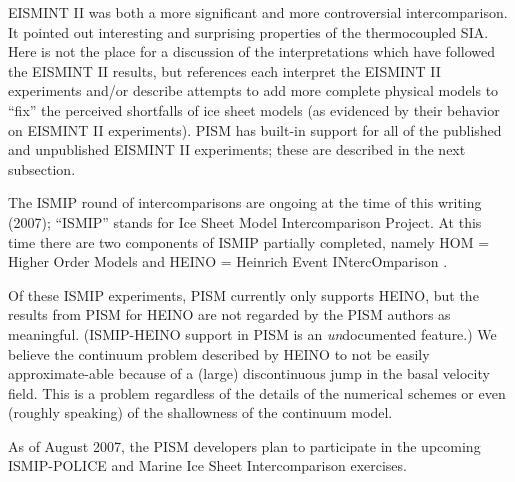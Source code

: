 \documentclass[11pt,final]{amsart}
\begin{document}
EISMINT II \cite{EISMINT00} was both a more significant and more controversial intercomparison.  It pointed out interesting and surprising properties of the thermocoupled SIA.  Here is not the place for a discussion of the interpretations which have followed the EISMINT II results, but references \cite{BBL,Hindmarsh04,Hindmarsh06,PayneBaldwin,SaitoEISMINT} each interpret the EISMINT II experiments and/or describe attempts to add more complete physical models to ``fix'' the perceived shortfalls of ice sheet models (as evidenced by their behavior on EISMINT II experiments).  PISM has built-in support for all of the published and unpublished EISMINT II experiments; these are described in the next subsection.

The ISMIP round of intercomparisons are ongoing at the time of this writing (2007); ``ISMIP'' stands for Ice Sheet Model Intercomparison Project.  At this time there are two components of ISMIP partially completed, namely HOM = Higher Order Models and HEINO = Heinrich Event INtercOmparison \cite{GreveTakahamaCalov}.

Of these ISMIP experiments, PISM currently only supports HEINO, but the results from PISM for HEINO are not regarded by the PISM authors as meaningful.  (ISMIP-HEINO support in PISM is an \emph{un}documented feature.)  We believe the continuum problem described by HEINO to not be easily approximate-able because of a (large) discontinuous jump in the basal velocity field.  This is a problem regardless of the details of the numerical schemes or even (roughly speaking) of the shallowness of the continuum model.

As of August 2007, the PISM developers plan to participate in the upcoming ISMIP-POLICE and Marine Ice Sheet Intercomparison exercises.
\end{document}
